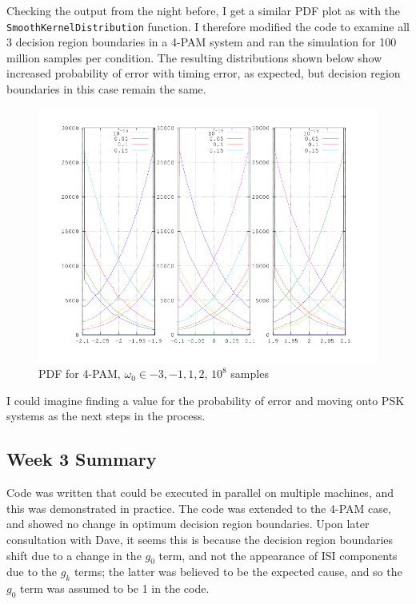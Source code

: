Checking the output from the night before, I get a similar PDF plot as
with the \texttt{SmoothKernelDistribution} function. I therefore
modified the code to examine all 3 decision region boundaries in a 4-PAM
system and ran the simulation for 100 million samples per condition. The
resulting distributions shown below show increased probability of error
with timing error, as expected, but decision region boundaries in this
case remain the same.

\begin{figure}[htbp]
\centering
\includegraphics{../plots/4pamdecision.png}
\caption{PDF for 4-PAM, $\omega_0 \in {-3,-1,1,2}$, $10^8$ samples}
\end{figure}

I could imagine finding a value for the probability of error and moving
onto PSK systems as the next steps in the process.

\subsection{Week 3 Summary}

Code was written that could be executed in parallel on multiple
machines, and this was demonstrated in practice. The code was extended
to the 4-PAM case, and showed no change in optimum decision region
boundaries. Upon later consultation with Dave, it seems this is because
the decision region boundaries shift due to a change in the $g_0$ term,
and not the appearance of ISI components due to the $g_k$ terms; the
latter was believed to be the expected cause, and so the $g_0$ term was
assumed to be 1 in the code.

